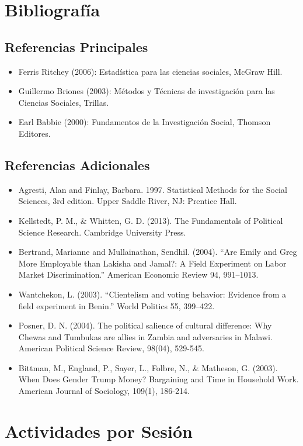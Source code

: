 \documentclass[letterpaper]{article}
\begin{document}
\section{Bibliografía}
\subsection{Referencias Principales}
\begin{itemize}
\item Ferris Ritchey (2006): Estadística para las ciencias sociales, McGraw Hill.
\item Guillermo Briones (2003): Métodos y Técnicas de investigación para las Ciencias Sociales,
Trillas.
\item Earl Babbie (2000): Fundamentos de la Investigación Social, Thomson Editores.
\end{itemize}

\subsection{Referencias Adicionales}
\begin{itemize}
	\item Agresti, Alan and Finlay, Barbara. 1997. Statistical Methods for the Social Sciences, 3rd edition. Upper
	Saddle River, NJ: Prentice Hall.
	\item Kellstedt, P. M., \& Whitten, G. D. (2013). The Fundamentals of Political Science Research. Cambridge University Press.
\item Bertrand, Marianne and Mullainathan, Sendhil. (2004). “Are Emily and Greg More
Employable than Lakisha and Jamal?: A Field Experiment on Labor Market Discrimination.”
American Economic Review 94, 991–1013.
\item Wantchekon, L. (2003). “Clientelism and voting behavior: Evidence from a field experiment
in Benin.” World Politics 55, 399–422.

\item Posner, D. N. (2004). The political salience of cultural difference: Why Chewas and Tumbukas are allies in Zambia and adversaries in Malawi. American Political Science Review, 98(04), 529-545.
\item Bittman, M., England, P., Sayer, L., Folbre, N., \& Matheson, G. (2003). When Does Gender Trump Money? Bargaining and Time in Household Work. American Journal of Sociology, 109(1), 186-214.
\end{itemize}
\section{Actividades por Sesión}
\end{document}
